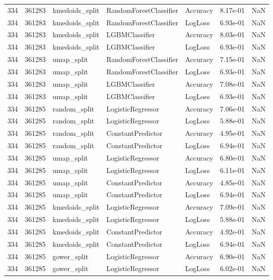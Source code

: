 \begin{tabular}{rrlllrr}
334 & 361283 & kmedoids\_split & RandomForestClassifier & Accuracy & 8.17e-01 & NaN \\
334 & 361283 & kmedoids\_split & RandomForestClassifier & LogLoss & 6.93e-01 & NaN \\
334 & 361283 & kmedoids\_split & LGBMClassifier & Accuracy & 8.03e-01 & NaN \\
334 & 361283 & kmedoids\_split & LGBMClassifier & LogLoss & 6.93e-01 & NaN \\
334 & 361283 & umap\_split & RandomForestClassifier & Accuracy & 7.15e-01 & NaN \\
334 & 361283 & umap\_split & RandomForestClassifier & LogLoss & 6.93e-01 & NaN \\
334 & 361283 & umap\_split & LGBMClassifier & Accuracy & 7.08e-01 & NaN \\
334 & 361283 & umap\_split & LGBMClassifier & LogLoss & 6.93e-01 & NaN \\
334 & 361285 & random\_split & LogisticRegressor & Accuracy & 7.06e-01 & NaN \\
334 & 361285 & random\_split & LogisticRegressor & LogLoss & 5.88e-01 & NaN \\
334 & 361285 & random\_split & ConstantPredictor & Accuracy & 4.95e-01 & NaN \\
334 & 361285 & random\_split & ConstantPredictor & LogLoss & 6.94e-01 & NaN \\
334 & 361285 & umap\_split & LogisticRegressor & Accuracy & 6.80e-01 & NaN \\
334 & 361285 & umap\_split & LogisticRegressor & LogLoss & 6.11e-01 & NaN \\
334 & 361285 & umap\_split & ConstantPredictor & Accuracy & 4.85e-01 & NaN \\
334 & 361285 & umap\_split & ConstantPredictor & LogLoss & 6.94e-01 & NaN \\
334 & 361285 & kmedoids\_split & LogisticRegressor & Accuracy & 7.09e-01 & NaN \\
334 & 361285 & kmedoids\_split & LogisticRegressor & LogLoss & 5.88e-01 & NaN \\
334 & 361285 & kmedoids\_split & ConstantPredictor & Accuracy & 4.92e-01 & NaN \\
334 & 361285 & kmedoids\_split & ConstantPredictor & LogLoss & 6.94e-01 & NaN \\
334 & 361285 & gower\_split & LogisticRegressor & Accuracy & 6.90e-01 & NaN \\
334 & 361285 & gower\_split & LogisticRegressor & LogLoss & 6.02e-01 & NaN \\

\end{tabular}
